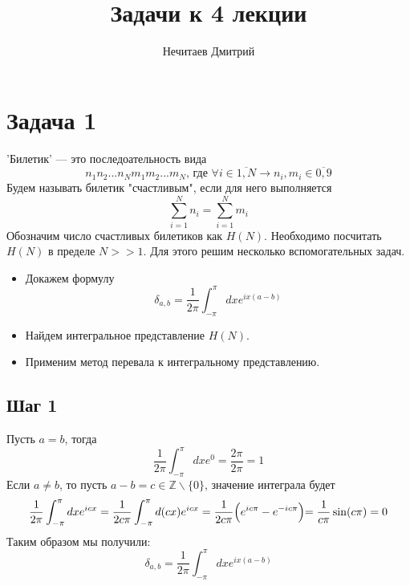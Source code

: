 \documentclass[12pt]{article}
\title{Задачи к 4 лекции}
\author{Нечитаев Дмитрий}
\begin{document}
 
	\maketitle
	\section*{Задача 1}
	'Билетик' --- это последоательность вида
	\[n_1n_2...n_Nm_1m_2...m_N \text{, где }\forall i \in \overline{1,N} \rightarrow n_i,m_i \in \overline{0,9} \]
	Будем называть билетик "счастливым", если для него выполняется
	\[\sum_{i=1}^{N} n_i = \sum_{i=1}^{N}m_i\]
	Обозначим число счастливых билетиков как $H(N)$. Необходимо посчитать $H(N)$ в пределе $N>>1$. Для этого решим несколько вспомогательных задач.
	\begin{itemize}
		\item Докажем формулу
		\[\delta_{a,b} = \frac{1}{2\pi}\int_{-\pi}^{\pi}dx e^{ix(a-b)}\]
		\item Найдем интегральное представление $H(N)$.
		\item Применим метод перевала к интегральному представлению.
	\end{itemize}
\subsection*{Шаг 1}
Пусть $a=b$, тогда
\[\frac{1}{2\pi}\int_{-\pi}^{\pi}dxe^0 =\frac{2\pi}{2\pi} = 1\]
Если $a\neq b$, то пусть $a-b = c \in \mathbb{Z}\backslash \{0\} $, значение интеграла будет 
\[\frac{1}{2\pi}\int_{-\pi}^{\pi}dxe^{icx} = \frac{1}{2c\pi}\int_{-\pi}^{\pi}d(cx)e^{icx} = \frac{1}{2c\pi}\Bigl(e^{ic\pi}-e^{-ic\pi}\Bigl) = \frac{1}{c\pi}\sin(c\pi) = 0\]
Таким образом мы получили:
\[\delta_{a,b} = \frac{1}{2\pi}\int_{-\pi}^{\pi}dx e^{ix(a-b)}\]
\end{document}
